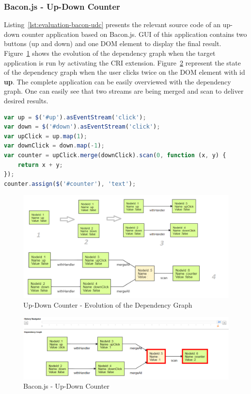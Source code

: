 \subsubsection{Bacon.js - Up-Down Counter}

Listing~\ref{lst:evaluation-bacon-udc} presents the relevant source code of an up-down counter application  based on Bacon.js. GUI of this application contains two buttons (up and down) and one DOM element to display the final result. Figure~\ref{fig:bacon_up_down_counter_evolution} shows the evolution of the dependency graph when the target application is run by activating the CRI extension. Figure~\ref{fig:bacon_up_down_final} represent the state of the dependency graph when the user clicks twice on the DOM element with id \textbf{up}. The complete application can be easily overviewed with the dependency graph. One can easily see that two streams are being merged and scan to deliver desired results. 

\begin{lstlisting}[language=JavaScript, caption=Bacon.js - Up-Down Counter, label={lst:evaluation-bacon-udc}]
var up = $('#up').asEventStream('click');
var down = $('#down').asEventStream('click');
var upClick = up.map(1);
var downClick = down.map(-1);
var counter = upClick.merge(downClick).scan(0, function (x, y) {
	return x + y;
});
counter.assign($('#counter'), 'text');
\end{lstlisting}


\begin{figure}[!h]
	\centering
	\includegraphics[width=\textwidth,height=\textheight,keepaspectratio]{gfx/evaluation/bacon_up_down_counter_evolution.png}
	\caption{Up-Down Counter - Evolution of the Dependency Graph}
	\label{fig:bacon_up_down_counter_evolution}
\end{figure}


\begin{figure}[!h]
	\centering
	\includegraphics[width=\textwidth,height=\textheight,keepaspectratio]{gfx/evaluation/bacon_up_down_final.png}
	\caption{Bacon.js - Up-Down Counter}
	\label{fig:bacon_up_down_final}
\end{figure}

